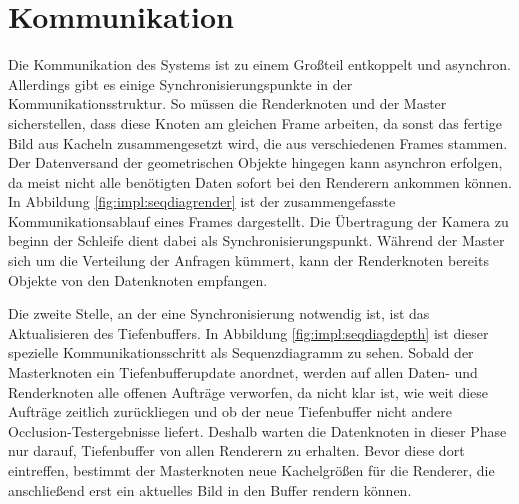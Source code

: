 \section{Kommunikation}
\label{sec:impl:kommunikation}
Die Kommunikation des Systems ist zu einem Großteil entkoppelt und asynchron. Allerdings gibt es einige Synchronisierungspunkte in der Kommunikationsstruktur. So müssen die Renderknoten und der Master sicherstellen, dass diese Knoten am gleichen Frame arbeiten, da sonst das fertige Bild aus Kacheln zusammengesetzt wird, die aus verschiedenen Frames stammen. Der Datenversand der geometrischen Objekte hingegen kann asynchron erfolgen, da meist nicht alle benötigten Daten sofort bei den Renderern ankommen können. In Abbildung \ref{fig:impl:seqdiagrender} ist der zusammengefasste Kommunikationsablauf eines Frames dargestellt. Die Übertragung der Kamera zu beginn der Schleife dient dabei als Synchronisierungspunkt. Während der Master sich um die Verteilung der Anfragen kümmert, kann der Renderknoten bereits Objekte von den Datenknoten empfangen.

Die zweite Stelle, an der eine Synchronisierung notwendig ist, ist das Aktualisieren des Tiefenbuffers. In Abbildung \ref{fig:impl:seqdiagdepth} ist dieser spezielle Kommunikationsschritt als Sequenzdiagramm zu sehen. Sobald der Masterknoten ein Tiefenbufferupdate anordnet, werden auf allen Daten- und Renderknoten alle offenen Aufträge verworfen, da nicht klar ist, wie weit diese Aufträge zeitlich zurückliegen und ob der neue Tiefenbuffer nicht andere Occlusion-Testergebnisse liefert. Deshalb warten die Datenknoten in dieser Phase nur darauf, Tiefenbuffer von allen Renderern zu erhalten. Bevor diese dort eintreffen, bestimmt der Masterknoten neue Kachelgrößen für die Renderer, die anschließend erst ein aktuelles Bild in den Buffer rendern können.

